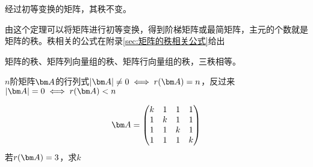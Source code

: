 \begin{theorem}
    经过初等变换的矩阵，其秩不变。
\end{theorem}
由这个定理可以将矩阵进行初等变换，得到阶梯矩阵或最简矩阵，主元的个数就是矩阵的秩。秩相关的公式在附录\ref{sec:矩阵的秩相关公式}给出
\begin{theorem}
    矩阵的秩、矩阵列向量组的秩、矩阵行向量组的秩，三秩相等。
\end{theorem}
\begin{theorem}
    $n$阶矩阵$\mat{A}$的行列式$|\mat{A}|\neq 0 \iff r(\mat{A}) = n$，反过来$|\mat{A}|=0\iff r(\mat{A})< n$
\end{theorem}
\begin{example}
    \[
        \mat{A} =
        \begin{pmatrix}
            k & 1 & 1 & 1 \\
            1 & k & 1 & 1 \\
            1 & 1 & k & 1 \\
            1 & 1 & 1 & k
        \end{pmatrix}
    \]
    若$r(\mat{A})=3$，求$k$
\end{example}
